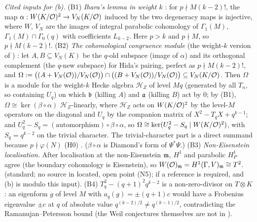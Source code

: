 \noindent\emph{Cited inputs for (b).}
(B1) \emph{Ihara's lemma in weight $k$} \cite[Lemma~3.2, p.~210]{Dia91}
 \stcited: for $p\nmid M(k-2)!$, the map
$\alpha:W(K/\mathcal{O})^2\to V_N(K/\mathcal{O})$ induced by the two degeneracy maps is injective, where $W$, $V_N$ are the images of integral parabolic
cohomology of $\Gamma_1(M)$, $\Gamma_1(M)\cap\Gamma_0(q)$ with coefficients $L_{k-2}$. Here $p>k$ and $p\nmid M$, so $p\nmid M(k-2)!$.
(B2) \emph{The cohomological congruence module} \cite[\S2, p.~207--208]{Dia91} (the weight-$k$ version of \cite[Prop.~3.3, p.~58--59]{Dia89}
) \stcited:
let $A,B\subseteq V_N(K)$ be the $q$-old subspace (image of $\alpha$) and its orthogonal complement (the $q$-new subspace) for Hida's pairing,
perfect as $p\nmid M(k-2)!$, and $\Omega:=\big((A+V_N(\mathcal{O}))/V_N(\mathcal{O})\big)\cap\big((B+V_N(\mathcal{O}))/V_N(\mathcal{O})\big)\subseteq V_N(K/\mathcal{O})$. Then $\Omega$ is a
module for the weight-$k$ Hecke algebra $\mathcal H_Z$ of level $Mq$ (generated by all $T_n$, so containing $U_q$) on which $\mathfrak{b}$ (killing
$A$) and $\mathfrak{a}$ (killing $B$) act by $0$; by (B1), $\Omega\cong\ker(\beta\circ\alpha)$ $\mathcal H_Z$-linearly, where $\mathcal H_Z$ acts on
$W(K/\mathcal{O})^2$ by the level-$M$ operators on the diagonal and $U_q$ by the companion matrix of $X^2-T_qX+q^{k-1}$; and
$U_q^2-S_q=(\text{automorphism})\circ\beta\circ\alpha$, so $\Omega\cong\ker(U_q^2-S_q\mid W(K/\mathcal{O})^2)$, with $S_q=q^{k-2}$ on the trivial character.
The trivial-character part is a direct summand because $p\nmid\varphi(N)$ (H0) \cite[p.~208]{Dia91}. ($\beta\circ\alpha$ is Diamond's form of
$\Psi^*\Psi$.)
(B3) \emph{Non-Eisenstein localisation.} After localisation at the non-Eisenstein $\mathfrak{m}$, $H^1$ and parabolic $H^1_P$ agree (the boundary
cohomology is Eisenstein), so $W(\mathcal{O})_{\mathfrak{m}}=H^1(\Gamma,V)_{\mathfrak{m}}\cong T^2$. \stknown{} (standard; no source in  located, open point (N5); \sttoprove{} if a reference is required, and (b) is \stpmc{} modulo this input).
(B4) $T_q^2-(q+1)^2q^{k-2}$ is a non-zero-divisor on $T\otimes K$: an eigenform $g$ of level $M$ with $a_q(g)=\pm(q+1)c$ would have a Frobenius
eigenvalue $\pm c$ at $q$ of absolute value $q^{(k-2)/2}\ne q^{(k-1)/2}$, contradicting the Ramanujan--Petersson bound \cite[Thm~5.6]{Del69}
 \stcited{} (the Weil conjectures themselves are not in ).

